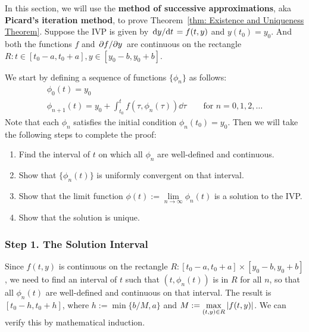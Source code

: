 \documentclass[10pt,UTF8]{article}
\theoremstyle{definition}
\newtheorem{definition inner}{Definition}[section]
\theoremstyle{definition}
\newtheorem{theorem inner}{Theorem}[section]
\theoremstyle{definition}
\newtheorem*{proof inner}{\textit{Proof}}
\theoremstyle{plain}
\newtheorem{tip inner}{Tip}[section]
\theoremstyle{remark}
\begin{document}
In this section, we will use the \textbf{method of successive approximations},
aka \textbf{Picard's iteration method},
to prove Theorem~\ref{thm: Existence and Uniqueness Theorem}.
Suppose the IVP is given by \( \dv*{y}{t} = f(t,y) \) and \( y(t_0) = y_0 \).
And both the functions \(f\) and \(\pdv*{f}{y}\) are continuous on the rectangle
\(R: t \in [t_0 - a, t_0 + a], y \in [y_0 - b, y_0 + b]\).

We start by defining a sequence of functions \( \{\phi_n\} \) as follows:
\begin{gather*}
  \phi_0(t) = y_0 \\
  \phi_{n+1}(t) = y_0 + \int_{t_0}^{t} f(\tau, \phi_n(\tau)) \dd{\tau}
  \qquad\text{for } n = 0, 1, 2, \dots
\end{gather*}
Note that each \(\phi_n\) satisfies the initial condition \(
\phi_n(t_0) = y_0 \).
Then we will take the following steps to complete the proof:
\begin{enumerate}
  \item Find the interval of \(t\) on which all \(\phi_n\) are
    well-defined and continuous.
  \item Show that \( \{ \phi_n(t) \} \) is uniformly convergent on
    that interval.
  \item Show that the limit function
    \( \phi(t) := \lim\limits_{n\to\infty} \phi_n(t) \)
    is a solution to the IVP\@.
  \item Show that the solution is unique.
\end{enumerate}

\subsubsection*{Step 1. The Solution Interval}

Since \(f(t,y)\) is continuous on the rectangle
\(R: [t_0 - a, t_0 + a] \times [y_0 - b, y_0 + b]\),
we need to find an interval of \(t\)
such that \((t, \phi_n(t))\) is in \(R\) for all \(n\),
so that all \(\phi_n(t)\) are well-defined and continuous on that interval.
The result is \([t_0 - h, t_0 + h]\),
where \(h := \min \{b/M, a\} \) and
\(M := \max\limits_{(t,y) \in R} \abs{f(t,y)} \).
We can verify this by mathematical induction.
\end{document}
